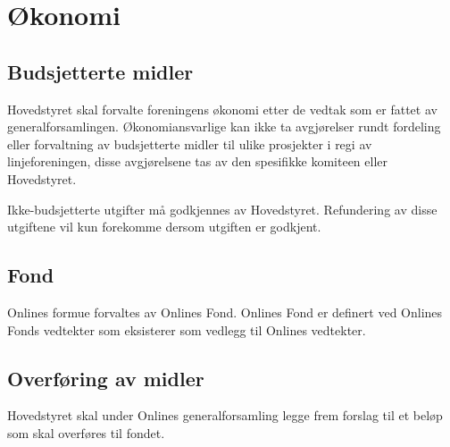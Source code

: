 \chapter{Økonomi}
\label{chap:okonomi}
\vspace{23pt}

\section{Budsjetterte midler}
Hovedstyret skal forvalte foreningens økonomi etter de vedtak som er fattet av generalforsamlingen. Økonomiansvarlige kan ikke ta avgjørelser rundt fordeling eller forvaltning av budsjetterte midler til ulike prosjekter i regi av linjeforeningen, disse avgjørelsene tas av den spesifikke komiteen eller Hovedstyret.

Ikke-budsjetterte utgifter må godkjennes av Hovedstyret. Refundering av disse utgiftene vil kun forekomme dersom utgiften er godkjent.

\section{Fond}
\vspace{23pt}

Onlines formue forvaltes av Onlines Fond. Onlines Fond er definert ved Onlines Fonds vedtekter som eksisterer som vedlegg til Onlines vedtekter.

\section{Overføring av midler}
\vspace{23pt}

Hovedstyret skal under Onlines generalforsamling legge frem forslag til et beløp som skal overføres til fondet.
